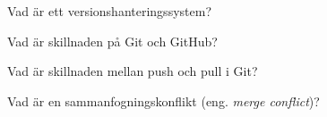 \item Vad är ett versionshanteringssystem?
\qskip
\item  Vad är skillnaden på Git och GitHub?
\qskip
\item Vad är skillnaden mellan push och pull i Git?
\qskip
\item Vad är en sammanfogningskonflikt (eng. \emph{merge conflict})?
